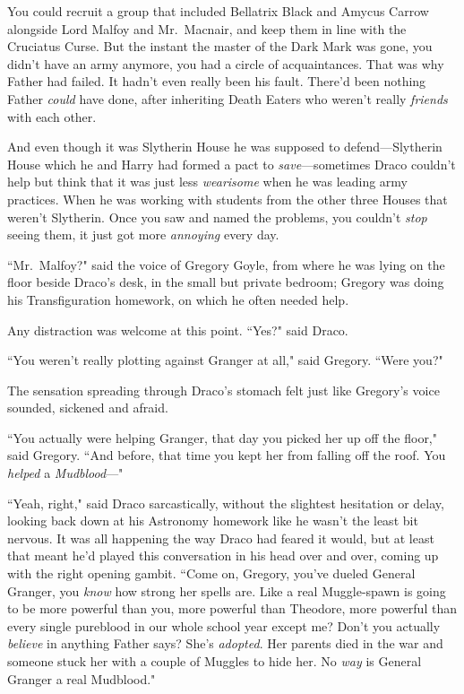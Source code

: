 You could recruit a group that included Bellatrix Black and Amycus Carrow alongside Lord Malfoy and Mr.~Macnair, and keep them in line with the Cruciatus Curse. But the instant the master of the Dark Mark was gone, you didn't have an army anymore, you had a circle of acquaintances. That was why Father had failed. It hadn't even really been his fault. There'd been nothing Father \emph{could} have done, after inheriting Death Eaters who weren't really \emph{friends} with each other.

And even though it was Slytherin House he was supposed to defend---Slytherin House which he and Harry had formed a pact to \emph{save}---sometimes Draco couldn't help but think that it was just less \emph{wearisome} when he was leading army practices. When he was working with students from the other three Houses that weren't Slytherin. Once you saw and named the problems, you couldn't \emph{stop} seeing them, it just got more \emph{annoying} every day.

``Mr.~Malfoy?" said the voice of Gregory Goyle, from where he was lying on the floor beside Draco's desk, in the small but private bedroom; Gregory was doing his Transfiguration homework, on which he often needed help.

Any distraction was welcome at this point. ``Yes?" said Draco.

``You weren't really plotting against Granger at all," said Gregory. ``Were you?"

The sensation spreading through Draco's stomach felt just like Gregory's voice sounded, sickened and afraid.

``You actually were helping Granger, that day you picked her up off the floor," said Gregory. ``And before, that time you kept her from falling off the roof. You \emph{helped} a \emph{Mudblood}---"

``Yeah, right," said Draco sarcastically, without the slightest hesitation or delay, looking back down at his Astronomy homework like he wasn't the least bit nervous. It was all happening the way Draco had feared it would, but at least that meant he'd played this conversation in his head over and over, coming up with the right opening gambit. ``Come on, Gregory, you've dueled General Granger, you \emph{know} how strong her spells are. Like a real Muggle-spawn is going to be more powerful than you, more powerful than Theodore, more powerful than every single pureblood in our whole school year except me? Don't you actually \emph{believe} in anything Father says? She's \emph{adopted}. Her parents died in the war and someone stuck her with a couple of Muggles to hide her. No \emph{way} is General Granger a real Mudblood."

